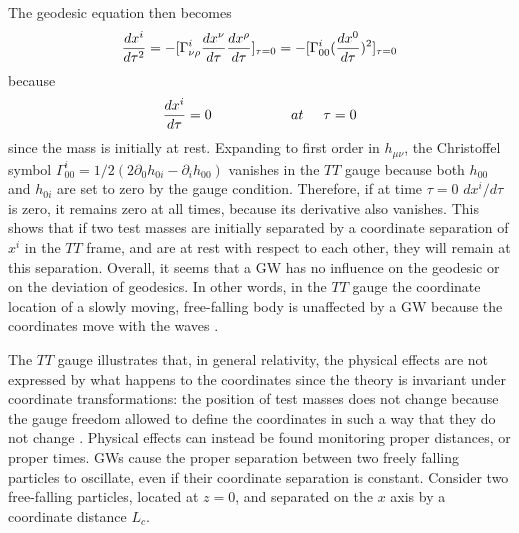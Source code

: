 \documentclass[binding=0.6cm, LaM]{sapthesis}
\begin{document}
	The geodesic equation then becomes
        \begin{equation}
          {{dx^i}\over{d\tau^2}} = -[\Gamma^i_{\nu\rho}{{dx^{\nu}}\over{d\tau}}{{dx^{\rho}}\over{d\tau}}]_{\tau=0} \\ 
          = - [ \Gamma^i_{00}({{dx^0}\over{d\tau}})^2]_{\tau=0}
        \end{equation}
        because
        \begin{equation}
          {{dx^i}\over{d\tau}} = 0 \hspace*{2cm} at \hspace*{0.5cm}\tau = 0
        \end{equation}
        since the mass is initially at rest. Expanding to first order in $h_{\mu\nu}$,
        the Christoffel symbol $\Gamma^i_{00} = 1/2(2\partial_{0}h_{0i} - \partial_i h_{00})$ vanishes in the $TT$ gauge
        because both $h_{00}$ and $h_{0i}$ are set to zero by the gauge condition.
        Therefore, if at time $\tau = 0$ $dx^i/d\tau$ is zero, it remains zero at all times,
        because its derivative also vanishes.
        This shows that if two test masses are initially separated by a coordinate separation of $x^i$ in the $TT$ frame,
        and are at rest with respect to each other, they will remain at this separation.
        Overall, it seems that a GW has no influence on the geodesic or on the deviation of geodesics. 
        In other words, in the $TT$ gauge the coordinate location of a slowly moving, free-falling body is unaffected
        by a GW because the coordinates move with the waves \cite{4}.

        The $TT$ gauge illustrates that, in general relativity, the physical effects are not expressed by what happens
        to the coordinates since the theory is invariant under coordinate transformations:
        the position of test masses does not change because the gauge freedom allowed to define the coordinates
        in such a way that they do not change \cite{3}.
        Physical effects can instead be found monitoring proper distances, or proper times. 
        GWs cause the proper separation between two freely falling particles to oscillate,
        even if their coordinate separation is constant. Consider two free-falling particles,
        located at $z = 0$, and separated on the $x$ axis by a coordinate distance $L_c$.
\end{document}
